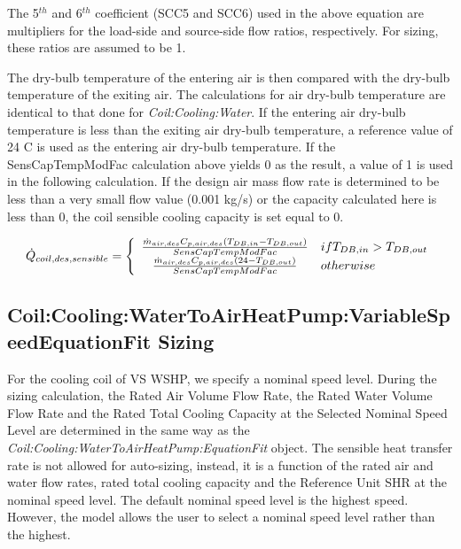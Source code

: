 The 5\(^{th}\) and 6\(^{th}\) coefficient (SCC5 and SCC6) used in the above equation are multipliers for the load-side and source-side flow ratios, respectively. For sizing, these ratios are assumed to be 1.

The dry-bulb temperature of the entering air is then compared with the dry-bulb temperature of the exiting air. The calculations for air dry-bulb temperature are identical to that done for \emph{Coil:Cooling:Water}. If the entering air dry-bulb temperature is less than the exiting air dry-bulb temperature, a reference value of 24 C is used as the entering air dry-bulb temperature. If the SensCapTempModFac calculation above yields 0 as the result, a value of 1 is used in the following calculation. If the design air mass flow rate is determined to be less than a very small flow value (0.001 kg/s) or the capacity calculated here is less than 0, the coil sensible cooling capacity is set equal to 0.

\begin{equation}
  \dot{Q}_{coil,des,sensible} = \left\{
                                  \begin{array}{cl}
                                    \frac{\dot{m}_{air,des}C_{p,air,des}\PB{T_{DB,in}-T_{DB,out}}}{SensCapTempModFac}  & if T_{DB,in}>T_{DB,out} \\
                                    \frac{\dot{m}_{air,des}C_{p,air,des}\PB{24       -T_{DB,out}}}{SensCapTempModFac}  & otherwise
                                  \end{array}
                                \right.
\end{equation}

\subsection{Coil:Cooling:WaterToAirHeatPump:VariableSpeedEquationFit Sizing}\label{coilcoolingwatertoairheatpumpvariablespeedequationfit-sizing}

For the cooling coil of VS WSHP, we specify a nominal speed level. During the sizing calculation, the Rated Air Volume Flow Rate, the Rated Water Volume Flow Rate and the Rated Total Cooling Capacity at the Selected Nominal Speed Level are determined in the same way as the \emph{Coil:Cooling:WaterToAirHeatPump:EquationFit} object. The sensible heat transfer rate is not allowed for auto-sizing, instead, it is a function of the rated air and water flow rates, rated total cooling capacity and the Reference Unit SHR at the nominal speed level. The default nominal speed level is the highest speed. However, the model allows the user to select a nominal speed level rather than the highest.

